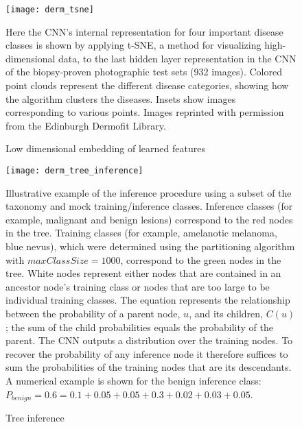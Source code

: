 \begin{figure}
\texttt{[image: derm\_tsne]}
\caption{Low dimensional embedding of learned features}
\vspace{12px}
Here the CNN’s internal representation for four important disease classes is shown by applying t-SNE, a method for visualizing high-dimensional data, to the last hidden layer representation in the CNN of the biopsy-proven photographic test sets (932 images). Colored point clouds represent the different disease categories, showing how the algorithm clusters the diseases. Insets show images corresponding to various points. Images reprinted with permission from the Edinburgh Dermofit Library.
\label{fig:derm_tsne}
\end{figure}

\begin{figure}
\texttt{[image: derm\_tree\_inference]}
\caption{Tree inference}
\vspace{12px}
Illustrative example of the inference procedure using a subset of the taxonomy and mock training/inference classes. Inference classes (for example, malignant and benign lesions) correspond to the red nodes in the tree. Training classes (for example, amelanotic melanoma, blue nevus), which were determined using the partitioning algorithm with $maxClassSize = 1000$, correspond to the green nodes in the tree. White nodes represent either nodes that are contained in an ancestor node’s training class or nodes that are too large to be individual training classes. The equation represents the relationship between the probability of a parent node, $u$, and its children, $C(u)$; the sum of the child probabilities equals the probability of the parent. The CNN outputs a distribution over the training nodes. To recover the probability of any inference node it therefore suffices to sum the probabilities of the training nodes that are its descendants. A numerical example is shown for the benign inference class: $P_{benign} = 0.6 = 0.1 + 0.05 + 0.05 + 0.3 + 0.02 + 0.03 + 0.05$.
\label{fig:derm_tree_inference}
\end{figure}

